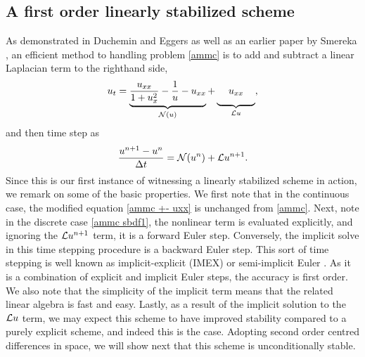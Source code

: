 \subsection{A first order linearly stabilized scheme}
As demonstrated in Duchemin and Eggers \cite{duchemin2014explicit} as well as an earlier paper by Smereka \cite{smereka2003semi}, an efficient method to handling problem \eqref{ammc} is to add and subtract a linear Laplacian term to the righthand side, 
\begin{align}
u_t = \underbrace{\frac{u_{xx}}{1 + u_x^2} 
- \frac{1}{u} 
- u_{xx}}_{\N(u)} 
+ \underbrace{\phantom{\frac{1_1}{1}}u_{xx}\phantom{\frac{1}{1_1}}}_{\L u}, 
\label{ammc +- uxx}
\end{align} 
and then time step as 
\begin{align}
\frac{u^{n+1} - u^n}{\Delta t} 
= \mathcal{N}(u^n) + \mathcal{L} u^{n+1}.
\label{ammc sbdf1}
\end{align}
Since this is our first instance of witnessing a linearly stabilized scheme in action, we remark on some of the basic properties. We first note that in the continuous case, the modified equation \eqref{ammc +- uxx} is unchanged from \eqref{ammc}. Next, note in the discrete case \eqref{ammc sbdf1}, the nonlinear term is evaluated explicitly, and ignoring the $\mathcal{L} u^{n+1}$ term, it is a forward Euler step. Conversely, the implicit solve in this time stepping procedure is a backward Euler step. This sort of time stepping is well known as implicit-explicit (IMEX) or semi-implicit Euler \cite{ascher1995implicit,smereka2003semi}. As it is a combination of explicit and implicit Euler steps, the accuracy is first order. We also note that the simplicity of the implicit term means that the related linear algebra is fast and easy. Lastly, as a result of the implicit solution to the $\mathcal{L} u$ term, we may expect this scheme to have improved stability compared to a purely explicit scheme, and indeed this is the case. Adopting second order centred differences in space, we will show next that this scheme is unconditionally stable.

